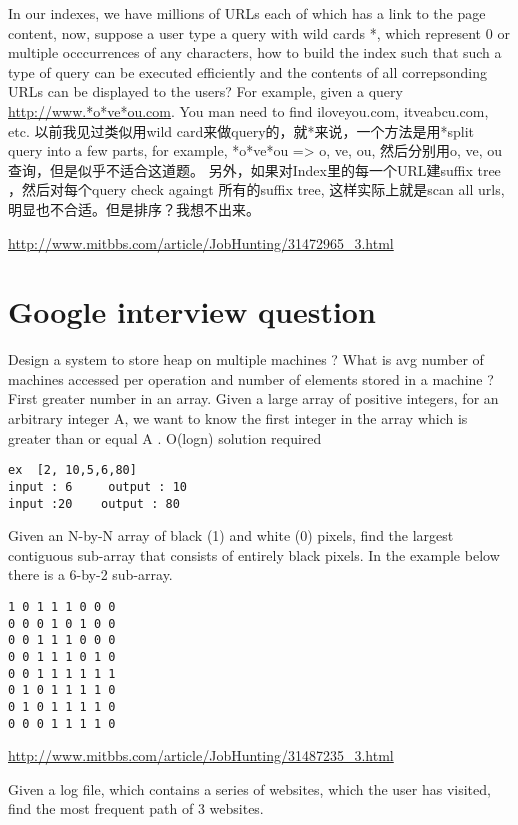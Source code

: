 \documentclass[12pt]{book}
\begin{document}
In our indexes, we have millions of URLs each of which has a link to the 
page content, now, suppose a user type a query with wild cards *, which 
represent 0 or multiple occcurrences of any characters, how to build the 
index such that such a type of query can be executed efficiently and the 
contents of all correpsonding URLs can be displayed to the users? For 
example, given a query \url{http://www.*o*ve*ou.com}. You man need to find iloveyou.com, itveabcu.com, etc. 
以前我见过类似用wild card来做query的，就*来说，一个方法是用*split
query into a few parts, for example, *o*ve*ou => o, ve, ou, 然后分别用o, ve, ou 查询，但是似乎不适合这道题。 另外，如果对Index里的每一个URL建suffix tree ，然后对每个query check againgt 所有的suffix tree, 这样实际上就是scan all urls, 明显也不合适。但是排序？我想不出来。

\url{http://www.mitbbs.com/article/JobHunting/31472965_3.html}

\chapter{Google interview question}
\label{sec-14}
Design a system to store heap on multiple machines ? What is avg number of 
machines accessed per operation and  number of elements stored in a machine ?
First greater number in an array. Given a large array of positive integers, 
for an arbitrary integer A, we want to know the first integer in the array 
which is greater than or equal A . O(logn) solution required
\lstset{language=java,label= ,caption= ,numbers=none}
\begin{lstlisting}
ex  [2, 10,5,6,80]
input : 6     output : 10
input :20    output : 80
\end{lstlisting}

Given an N-by-N array of black (1) and white (0) pixels, find the largest 
contiguous sub-array that consists of entirely black pixels. In the example 
below there is a 6-by-2 sub-array.

\lstset{language=java,label= ,caption= ,numbers=none}
\begin{lstlisting}
1 0 1 1 1 0 0 0
0 0 0 1 0 1 0 0
0 0 1 1 1 0 0 0
0 0 1 1 1 0 1 0
0 0 1 1 1 1 1 1
0 1 0 1 1 1 1 0
0 1 0 1 1 1 1 0
0 0 0 1 1 1 1 0
\end{lstlisting}

\url{http://www.mitbbs.com/article/JobHunting/31487235_3.html}

Given a log file, which contains a series of websites, which the user has 
visited, find the most frequent path of 3 websites.
\end{document}
